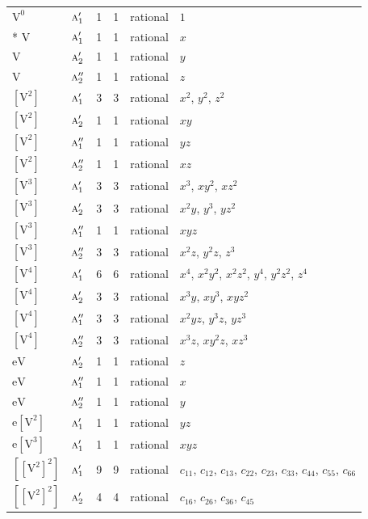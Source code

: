 \documentclass[10pt,a4paper]{article}
\numberwithin{equation}{section}
\newcommand{\irr}[1]{\text{\normalfont\scshape #1}}
\newcommand{\jahn}[1]{\mathrm{#1}}
\newlength{\fillwidth}\newlength{\cellwidth}\newlength{\colwidth}
\begin{document}
{\begin{longtable}{@{}llrrl>{\RaggedRight\arraybackslash}p{\fillwidth}@{}}
\bottomrule\endfoot\endlastfoot
$\jahn{V^{0}}$ & $\irr{a}_{1}'$ & 1 & 1 & rational & $1$\\*
$\jahn{V}$ & $\irr{a}_{1}'$ & 1 & 1 & rational & $x$\\
$\jahn{V}$ & $\irr{a}_{2}'$ & 1 & 1 & rational & $y$\\
$\jahn{V}$ & $\irr{a}_{2}''$ & 1 & 1 & rational & $z$\\
$\jahn{[V^{2}]}$ & $\irr{a}_{1}'$ & 3 & 3 & rational & $x^{2}$, $y^{2}$, $z^{2}$\\
$\jahn{[V^{2}]}$ & $\irr{a}_{2}'$ & 1 & 1 & rational & $xy$\\
$\jahn{[V^{2}]}$ & $\irr{a}_{1}''$ & 1 & 1 & rational & $yz$\\
$\jahn{[V^{2}]}$ & $\irr{a}_{2}''$ & 1 & 1 & rational & $xz$\\
$\jahn{[V^{3}]}$ & $\irr{a}_{1}'$ & 3 & 3 & rational & $x^{3}$, $xy^{2}$, $xz^{2}$\\
$\jahn{[V^{3}]}$ & $\irr{a}_{2}'$ & 3 & 3 & rational & $x^{2}y$, $y^{3}$, $yz^{2}$\\
$\jahn{[V^{3}]}$ & $\irr{a}_{1}''$ & 1 & 1 & rational & $xyz$\\
$\jahn{[V^{3}]}$ & $\irr{a}_{2}''$ & 3 & 3 & rational & $x^{2}z$, $y^{2}z$, $z^{3}$\\
$\jahn{[V^{4}]}$ & $\irr{a}_{1}'$ & 6 & 6 & rational & $x^{4}$, $x^{2}y^{2}$, $x^{2}z^{2}$, $y^{4}$, $y^{2}z^{2}$, $z^{4}$\\
$\jahn{[V^{4}]}$ & $\irr{a}_{2}'$ & 3 & 3 & rational & $x^{3}y$, $xy^{3}$, $xyz^{2}$\\
$\jahn{[V^{4}]}$ & $\irr{a}_{1}''$ & 3 & 3 & rational & $x^{2}yz$, $y^{3}z$, $yz^{3}$\\
$\jahn{[V^{4}]}$ & $\irr{a}_{2}''$ & 3 & 3 & rational & $x^{3}z$, $xy^{2}z$, $xz^{3}$\\
$\jahn{eV}$ & $\irr{a}_{2}'$ & 1 & 1 & rational & $z$\\
$\jahn{eV}$ & $\irr{a}_{1}''$ & 1 & 1 & rational & $x$\\
$\jahn{eV}$ & $\irr{a}_{2}''$ & 1 & 1 & rational & $y$\\
$\jahn{e[V^{2}]}$ & $\irr{a}_{1}'$ & 1 & 1 & rational & $yz$\\
$\jahn{e[V^{3}]}$ & $\irr{a}_{1}'$ & 1 & 1 & rational & $xyz$\\
$\jahn{[[V^{2}]^{2}]}$ & $\irr{a}_{1}'$ & 9 & 9 & rational & $c_{11}$, $c_{12}$, $c_{13}$, $c_{22}$, $c_{23}$, $c_{33}$, $c_{44}$, $c_{55}$, $c_{66}$\\
$\jahn{[[V^{2}]^{2}]}$ & $\irr{a}_{2}'$ & 4 & 4 & rational & $c_{16}$, $c_{26}$, $c_{36}$, $c_{45}$\\

\end{longtable}}
\end{document}
